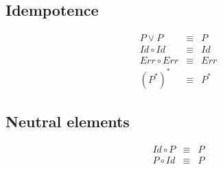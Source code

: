 \subsection{Idempotence}
\begin{eqnarray*}
  P \vee P & \equiv & P \\
  Id \circ Id & \equiv & Id \\
  Err \circ Err & \equiv & Err \\
  (P^*)^* & \equiv & P^*
\end{eqnarray*}

\subsection{Neutral elements}
\begin{eqnarray*}
  Id \circ P & \equiv & P \\
  P \circ Id & \equiv & P
\end{eqnarray*}